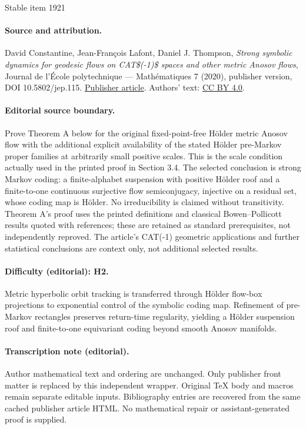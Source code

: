 \documentclass[11pt]{article}
\theoremstyle{definition}
\numberwithin{equation}{section}
\begin{document}
\begin{center}{\Large Stable item 1921}\end{center}
\paragraph{Source and attribution.}
David Constantine, Jean-François Lafont, Daniel J. Thompson, \emph{Strong symbolic dynamics for geodesic flows on CAT\$(-1)\$ spaces and other metric Anosov flows}, Journal de l’École polytechnique — Mathématiques 7 (2020), publisher version, DOI 10.5802/jep.115. \href{https://jep.centre-mersenne.org/articles/10.5802/jep.115/}{Publisher article}. Authors' text: \href{https://creativecommons.org/licenses/by/4.0/}{CC BY 4.0}.
\paragraph{Editorial source boundary.}
Prove Theorem A below for the original fixed-point-free Hölder metric Anosov flow with the additional explicit availability of the stated Hölder pre-Markov proper families at arbitrarily small positive scales. This is the scale condition actually used in the printed proof in Section 3.4. The selected conclusion is strong Markov coding: a finite-alphabet suspension with positive Hölder roof and a finite-to-one continuous surjective flow semiconjugacy, injective on a residual set, whose coding map is Hölder. No irreducibility is claimed without transitivity. Theorem A's proof uses the printed definitions and classical Bowen--Pollicott results quoted with references; these are retained as standard prerequisites, not independently reproved. The article's CAT(-1) geometric applications and further statistical conclusions are context only, not additional selected results.
\paragraph{Difficulty (editorial): H2.}
Metric hyperbolic orbit tracking is transferred through Hölder flow-box projections to exponential control of the symbolic coding map. Refinement of pre-Markov rectangles preserves return-time regularity, yielding a Hölder suspension roof and finite-to-one equivariant coding beyond smooth Anosov manifolds.
\paragraph{Transcription note (editorial).}
Author mathematical text and ordering are unchanged. Only publisher front matter is replaced by this independent wrapper. Original TeX body and macros remain separate editable inputs. Bibliography entries are recovered from the same cached publisher article HTML. No mathematical repair or assistant-generated proof is supplied.
\clearpage
\end{document}
